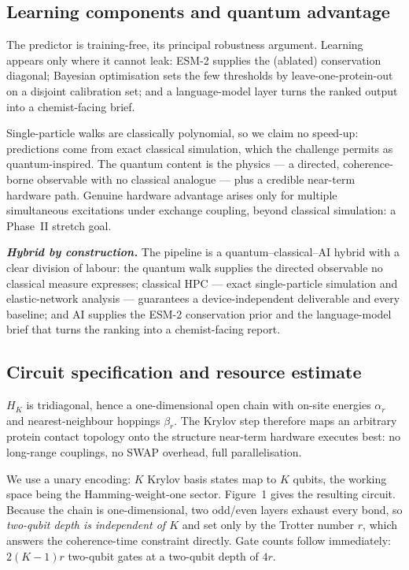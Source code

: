 \documentclass[10pt,a4paper]{article}
\newcommand{\lead}[1]{\textbf{\textit{#1}}}
\begin{document}
\subsection{Learning components and quantum advantage}

The predictor is training-free, its principal robustness argument. Learning appears only where it
cannot leak: ESM-2 supplies the (ablated) conservation diagonal; Bayesian optimisation sets the few
thresholds by leave-one-protein-out on a disjoint calibration set; and a language-model layer turns
the ranked output into a chemist-facing brief.

Single-particle walks are classically polynomial, so we claim no speed-up: predictions come from exact
classical simulation, which the challenge permits as quantum-inspired. The quantum content is the
physics --- a directed, coherence-borne observable with no classical analogue --- plus a credible
near-term hardware path. Genuine hardware advantage arises only for multiple simultaneous excitations
under exchange coupling, beyond classical simulation: a Phase~II stretch goal.

\lead{Hybrid by construction.} The pipeline is a quantum--classical--AI hybrid with a clear division
of labour: the quantum walk supplies the directed observable no classical measure expresses; classical
HPC --- exact single-particle simulation and elastic-network analysis --- guarantees a
device-independent deliverable and every baseline; and AI supplies the ESM-2 conservation prior and
the language-model brief that turns the ranking into a chemist-facing report.

\subsection{Circuit specification and resource estimate}

$H_K$ is tridiagonal, hence a one-dimensional open chain with on-site energies $\alpha_r$ and
nearest-neighbour hoppings $\beta_r$. The Krylov step therefore maps an arbitrary protein contact
topology onto the structure near-term hardware executes best: no long-range couplings, no SWAP overhead, full parallelisation.

We use a unary encoding: $K$ Krylov basis states map to $K$ qubits, the working space being the
Hamming-weight-one sector. Figure~1 gives the resulting circuit. Because the chain is
one-dimensional, two odd/even layers exhaust every bond, so \emph{two-qubit depth is independent of
$K$} and set only by the Trotter number $r$, which answers the coherence-time constraint directly. Gate counts follow immediately: $2(K-1)r$ two-qubit gates at a two-qubit depth of $4r$.
\end{document}
